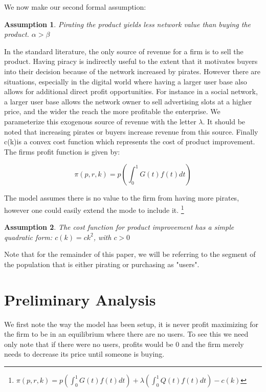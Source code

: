 \documentclass{article}
\newtheorem{assumption}{Assumption}
\begin{document}
We now make our second formal assumption: 

\begin{assumption}
Pirating the product yields less network value than buying the product. $\alpha>\beta$
\end{assumption}

In the standard literature, the only source of revenue for a firm is to sell the product. Having piracy is indirectly useful to the extent that it motivates buyers into their decision because of the network increased by pirates. However there are situations, especially in the digital world where having a larger user base also allows for additional direct profit opportunities. For instance in a social network, a larger user base allows the network owner to sell advertising slots at a higher price, and the wider the reach the more profitable the enterprise. We parameterize this exogenous source of revenue with the letter $\lambda$. It should be noted that increasing pirates or buyers increase revenue from this source. Finally c(k)is a convex cost function which represents the cost of product improvement. The firms profit function is given by:

\begin{equation} \label{eq:profit1}
\pi(p,r,k) 
=p\left(\int^{1}_{0}G(t)f(t)dt\right) 
\end{equation}

The model assumes there is no value to the firm from having more pirates, however one could easily extend the mode to include it. \footnote{$\pi(p,r,k) 
=p\left(\int^{1}_{0}G(t)f(t)dt\right) 
+ \lambda \left(\int^{1}_{0}Q(t)f(t)dt\right)- c(k) $} 

\begin{assumption}
The cost function for product improvement has a simple quadratic form: $c(k)= ck^2$, with $c>0$
\end{assumption}

Note that for the remainder of this paper, we will be referring to the segment of the population that is either pirating or purchasing as "users".

\section{Preliminary Analysis}

We first note the way the model has been setup, it is never profit maximizing for the firm to be in an equilibrium where there are no users. To see this we need only note that if there were no users, profits would be 0 and the firm merely needs to decrease its price until someone is buying. 
\end{document}
